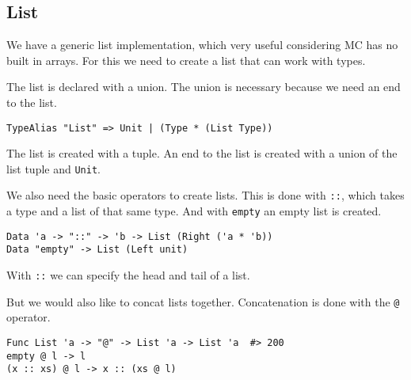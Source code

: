 




\subsection{List}
We have a generic list implementation, which very useful considering MC has no built in arrays.
For this we need to create a list that can work with types.

The list is declared with a union.
The union is necessary because we need an end to the list.

\begin{lstlisting}
TypeAlias "List" => Unit | (Type * (List Type))
\end{lstlisting}

The list is created with a tuple.
An end to the list is created with a union of the list tuple and \texttt{Unit}.

We also need the basic operators to create lists.
This is done with \texttt{::}, which takes a type and a list of that same type.
And with \texttt{empty} an empty list is created.

\begin{lstlisting}
Data 'a -> "::" -> 'b -> List (Right ('a * 'b))
Data "empty" -> List (Left unit)
\end{lstlisting}

With \texttt{::} we can specify the head and tail of a list.

But we would also like to concat lists together.
Concatenation is done with the \texttt{@} operator.

\begin{lstlisting}
Func List 'a -> "@" -> List 'a -> List 'a  #> 200
empty @ l -> l
(x :: xs) @ l -> x :: (xs @ l)
\end{lstlisting}

